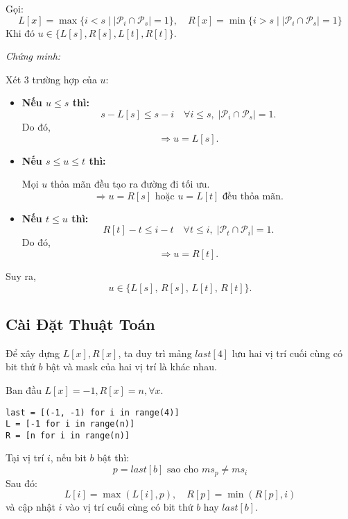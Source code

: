 \documentclass[12pt,a4paper]{article}
\begin{document}
	Gọi:
	\[
	L[x] = \max \{ i < s \mid |\mathcal{P}_i \cap \mathcal{P}_s| = 1 \}, \quad
	R[x] = \min \{ i > s \mid |\mathcal{P}_i \cap \mathcal{P}_s| = 1 \}
	\]
	Khi đó $u \in \{L[s], R[s], L[t], R[t]\}$.
	
	\textit{Chứng minh:}  
	
	Xét $3$ trường hợp của $u$:
	
	\begin{itemize}
		\item \textbf{Nếu $u \le s$ thì:}
		\[
		s - L[s] \le s - i \quad \forall i \le s, \; |\mathcal{P}_{i} \cap \mathcal{P}_{s}| = 1.
		\]
		Do đó, 
		\[
		\Rightarrow u = L[s].
		\]
		
		\item \textbf{Nếu $s \le u \le t$ thì:}
		
		Mọi $u$ thỏa mãn đều tạo ra đường đi tối ưu.
		\[
		\Rightarrow u = R[s] \text{ hoặc } u = L[t] \text{ đều thỏa mãn.}
		\]
		
		\item \textbf{Nếu $t \le u$ thì:}
		\[
		R[t] - t \le i - t \quad \forall t \le i, \; |\mathcal{P}_{t} \cap \mathcal{P}_{i}| = 1.
		\]
		Do đó, 
		\[
		\Rightarrow u = R[t].
		\]
	\end{itemize}
	
	Suy ra, 
	\[
	u \in \{ L[s],\, R[s],\, L[t],\, R[t] \}.
	\]
	
	
	\subsection{Cài Đặt Thuật Toán}
	
	Để xây dựng $L[x], R[x]$, ta duy trì mảng $last[4]$ lưu hai vị trí cuối cùng có bit thứ $b$ bật và mask của hai vị trí là khác nhau.  
	
	Ban đầu $L[x] = -1, R[x] = n, \forall x$.
\begin{lstlisting}
last = [(-1, -1) for i in range(4)]
L = [-1 for i in range(n)]
R = [n for i in range(n)]
\end{lstlisting}
	Tại vị trí $i$, nếu bit $b$ bật thì:
	\[
	p = last[b] \text{ sao cho } ms_p \ne ms_i
	\]
	Sau đó:
	\[
	L[i] = \max(L[i], p), \quad R[p] = \min(R[p], i)
	\]
	và cập nhật $i$ vào vị trí cuối cùng có bit thứ $b$ hay $last[b]$.
\end{document}
